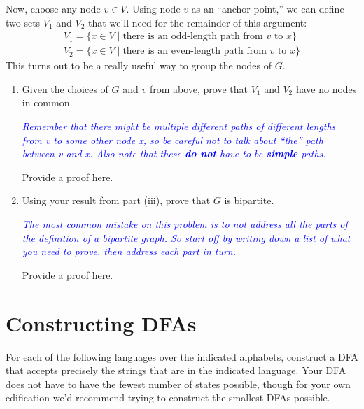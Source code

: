 \documentclass{article}
\renewcommand{\(}{\left(}
\renewcommand{\)}{\right)}
\theoremstyle{plain}
\theoremstyle{plain}
\theoremstyle{definition}
\renewcommand{\emph}[1]{\textit{\textbf{#1}}}
\newcommand{\annotate}[1]{\textit{\textcolor{blue}{#1}}}
\begin{document}
Now, choose any node $v \in V$. Using node $v$ as an ``anchor point,'' we can define two sets $V_1$ and $V_2$ that we'll need for the remainder of this argument:
\begin{gather*}
V_1 = \{ x \in V \mid \text{there is an odd-length path from $v$ to $x$} \} \\
V_2 = \{ x \in V \mid \text{there is an even-length path from $v$ to $x$} \}
\end{gather*}
This turns out to be a really useful way to group the nodes of $G$.

\begin{enumerate}[resume*]
\item Given the choices of $G$ and $v$ from above, prove that $V_1$ and $V_2$ have no nodes in common.

\annotate{Remember that there might be multiple different paths of 
different lengths from v to some other node x, so
be careful not to talk about ``the'' path between v and x. Also note that these \emph{do not} have to be \emph{simple} paths.}

\begin{shaded}
Provide a proof here.
\end{shaded}

\item Using your result from part (iii), prove that $G$ is bipartite.

\annotate{The most common mistake on this problem is to not address all the parts of the definition of a bipartite graph. So start off by writing down a list of what you need to prove, then address each part in turn.}

\begin{shaded}
Provide a proof here.
\end{shaded}

\end{enumerate}

\pagebreak
















\section{Constructing DFAs}

For each of the following languages over the indicated alphabets, construct a DFA that accepts precisely the strings that are in the indicated language. Your DFA does not have to have the fewest number of states possible, though for your own edification we'd recommend trying to construct the smallest DFAs possible. \\
\end{document}
